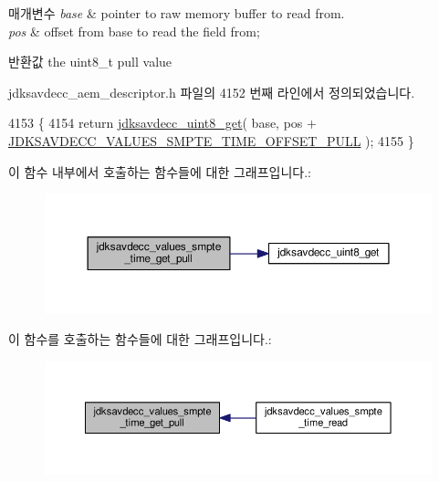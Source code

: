 \begin{DoxyParams}{매개변수}
{\em base} & pointer to raw memory buffer to read from. \\
\hline
{\em pos} & offset from base to read the field from; \\
\hline
\end{DoxyParams}
\begin{DoxyReturn}{반환값}
the uint8\+\_\+t pull value 
\end{DoxyReturn}


jdksavdecc\+\_\+aem\+\_\+descriptor.\+h 파일의 4152 번째 라인에서 정의되었습니다.


\begin{DoxyCode}
4153 \{
4154     \textcolor{keywordflow}{return} \hyperlink{group__endian_ga27091e0bf32429d162f641a3f4bc933f}{jdksavdecc\_uint8\_get}( base, pos + 
      \hyperlink{group__values__smpte__time_ga058ad33b1ebfa0fdf51707a7bc324626}{JDKSAVDECC\_VALUES\_SMPTE\_TIME\_OFFSET\_PULL} );
4155 \}
\end{DoxyCode}


이 함수 내부에서 호출하는 함수들에 대한 그래프입니다.\+:
\nopagebreak
\begin{figure}[H]
\begin{center}
\leavevmode
\includegraphics[width=350pt]{group__values__smpte__time_ga178d6c008a67cfc49e748b4d0ad63c20_cgraph}
\end{center}
\end{figure}




이 함수를 호출하는 함수들에 대한 그래프입니다.\+:
\nopagebreak
\begin{figure}[H]
\begin{center}
\leavevmode
\includegraphics[width=350pt]{group__values__smpte__time_ga178d6c008a67cfc49e748b4d0ad63c20_icgraph}
\end{center}
\end{figure}


